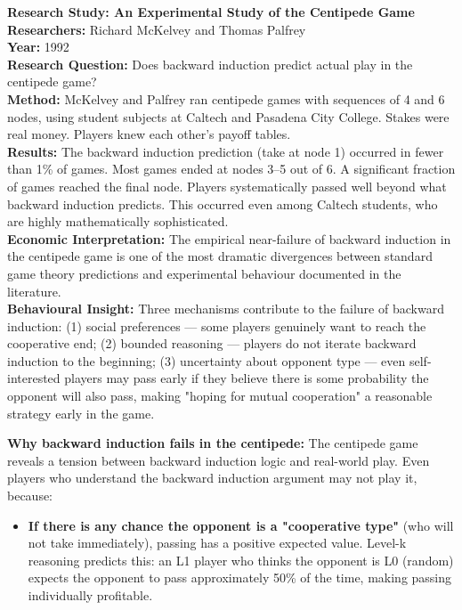 \documentclass[12pt, letterpaper]{article}
\begin{document}
\begin{researchbox}
\textbf{Research Study: An Experimental Study of the Centipede Game}\\[4pt]

\textbf{Researchers:} Richard McKelvey and Thomas Palfrey\\[4pt]
\textbf{Year:} 1992\\[4pt]
\textbf{Research Question:} Does backward induction predict actual play in the centipede game?\\[4pt]
\textbf{Method:} McKelvey and Palfrey ran centipede games with sequences of 4 and 6 nodes, using student subjects at Caltech and Pasadena City College. Stakes were real money. Players knew each other's payoff tables.\\[4pt]
\textbf{Results:} The backward induction prediction (take at node 1) occurred in fewer than 1\% of games. Most games ended at nodes 3--5 out of 6. A significant fraction of games reached the final node. Players systematically passed well beyond what backward induction predicts. This occurred even among Caltech students, who are highly mathematically sophisticated.\\[4pt]
\textbf{Economic Interpretation:} The empirical near-failure of backward induction in the centipede game is one of the most dramatic divergences between standard game theory predictions and experimental behaviour documented in the literature.\\[4pt]
\textbf{Behavioural Insight:} Three mechanisms contribute to the failure of backward induction: (1) social preferences --- some players genuinely want to reach the cooperative end; (2) bounded reasoning --- players do not iterate backward induction to the beginning; (3) uncertainty about opponent type --- even self-interested players may pass early if they believe there is some probability the opponent will also pass, making "hoping for mutual cooperation" a reasonable strategy early in the game.\\[4pt]
\end{researchbox}

\textbf{Why backward induction fails in the centipede:} The centipede game reveals a tension between backward induction logic and real-world play. Even players who understand the backward induction argument may not play it, because:

\begin{itemize}
\item \textbf{If there is any chance the opponent is a "cooperative type"} (who will not take immediately), passing has a positive expected value. Level-k reasoning predicts this: an L1 player who thinks the opponent is L0 (random) expects the opponent to pass approximately 50\% of the time, making passing individually profitable.
\end{itemize}
\end{document}
